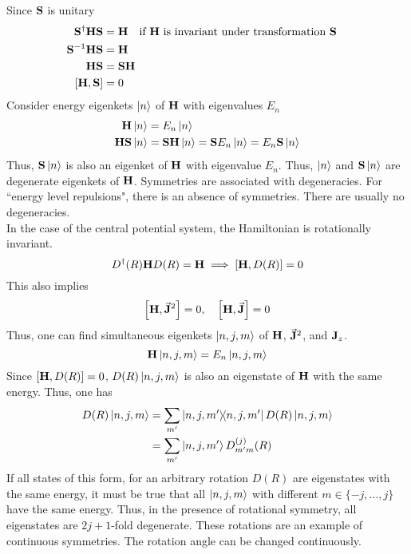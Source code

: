 \documentclass[12pt,a4paper,titlepage]{article}
\begin{document}
Since $\vb{S}$ is unitary
\begin{equation}
\begin{aligned}
\vb{S}^{\dagger}\vb{H}\vb{S}&=\vb{H}\qq{if $\vb{H}$ is invariant under transformation $\vb{S}$}\\
\vb{S}^{-1}\vb{H}\vb{S}&=\vb{H}\\
\vb{H}\vb{S}&=\vb{S}\vb{H}\\
\comm{\vb{H}}{\vb{S}}&=0
\end{aligned}
\end{equation}
Consider energy eigenkets $\ket{n}$ of $\vb{H}$ with eigenvalues $E_{n}$
\begin{equation}
\begin{aligned}
\vb{H}\ket{n}&=E_{n}\ket{n}\\
\vb{H}\vb{S}\ket{n}&=\vb{S}\vb{H}\ket{n}=\vb{S}E_{n}\ket{n}=E_{n}\vb{S}\ket{n}
\end{aligned}
\end{equation}
Thus, $\vb{S}\ket{n}$ is also an eigenket of $\vb{H}$ with eigenvalue $E_{n}$. Thus, $\ket{n}$ and $\vb{S}\ket{n}$ are degenerate eigenkets of $\vb{H}$. Symmetries are associated with degeneracies. For ``energy level repulsions", there is an absence of symmetries. There are usually no degeneracies.\\

In the case of the central potential system, the Hamiltonian is rotationally invariant.
\begin{equation}
D^{\dagger}(R)\vb{H}D(R)=\vb{H}\implies\comm{\vb{H}}{D(R)}=0
\end{equation}
This also implies
\begin{equation}
\comm{\vb{H}}{\vec{\vb{J}}^{2}}=0,\quad\comm{\vb{H}}{\vec{\vb{J}}}=0
\end{equation}
Thus, one can find simultaneous eigenkets $\ket{n,j,m}$ of $\vb{H}$, $\vec{\vb{J}}^{2}$, and $\vb{J}_{z}$.
\begin{equation}
\vb{H}\ket{n,j,m}=E_{n}\ket{n,j,m}
\end{equation}
Since $\comm{\vb{H}}{D(R)}=0$, $D(R)\ket{n,j,m}$ is also an eigenstate of $\vb{H}$ with the same energy. Thus, one has
\begin{equation}
\begin{aligned}
D(R)\ket{n,j,m}&=\sum_{m'}\op{n,j,m'}D(R)\ket{n,j,m}\\
&=\sum_{m'}\ket{n,j,m'}D^{(j)}_{m'm}(R)
\end{aligned}
\end{equation}
If all states of this form, for an arbitrary rotation $D(R)$ are eigenstates with the same energy, it must be true that all $\ket{n,j,m}$ with different $m\in\{-j,\ldots,j\}$ have the same energy. Thus, in the presence of rotational symmetry, all eigenstates are $2j+1$-fold degenerate. These rotations are an example of continuous symmetries. The rotation angle can be changed continuously.
\end{document}
